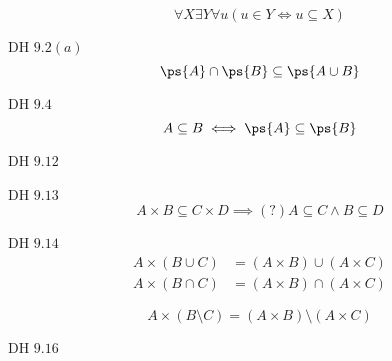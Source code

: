 \begin{frame}{}
  \begin{definition}
    \[
      \forall X \exists Y \forall u (u \in Y \iff u \subseteq X)
    \]
  \end{definition}
\end{frame}

\begin{frame}{}
  \begin{exampleblock}{DH $9.2 (a)$}
    \[
      \ps{A} \cap \ps{B} \subseteq \ps{A \cup B}
    \]
  \end{exampleblock}
\end{frame}

\begin{frame}{}
  \begin{exampleblock}{DH $9.4$}
    \[
      A \subseteq B \iff \ps{A} \subseteq \ps{B}
    \]
  \end{exampleblock}
\end{frame}

\begin{frame}{}
  \begin{exampleblock}{DH $9.12$}
  \end{exampleblock}
\end{frame}

\begin{frame}{}
  \begin{exampleblock}{DH $9.13$}
    \[
      A \times B \subseteq C \times D \implies (?) A \subseteq C \land B \subseteq D
    \]
  \end{exampleblock}
\end{frame}

\begin{frame}{}
  \begin{exampleblock}{DH $9.14$}
    \begin{align*}
      A \times (B \cup C) &= (A \times B) \cup (A \times C)\\
      A \times (B \cap C) &= (A \times B) \cap (A \times C)
    \end{align*}
  \end{exampleblock}

  \pause
  \[
    A \times (B \setminus C) = (A \times B) \setminus (A \times C)
  \]
\end{frame}

\begin{frame}{}
  \begin{exampleblock}{DH $9.16$}
  \end{exampleblock}
\end{frame}
